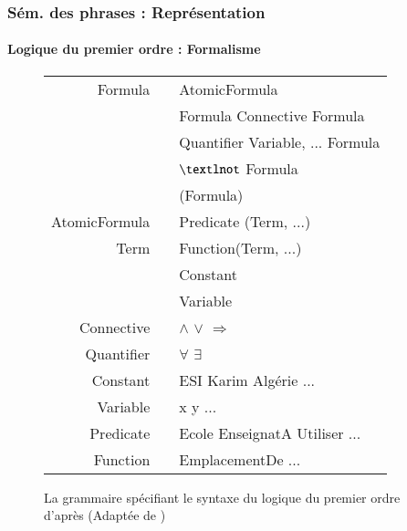 \documentclass[xcolor=table]{beamer}
\begin{document}
\begin{frame}
	\frametitle{Sém. des phrases : Représentation}
	\framesubtitle{Logique du premier ordre : Formalisme}
	
	\begin{figure}
		\scriptsize
		\begin{tabular}{rcl}
			\hline\hline
			Formula & \textrightarrow & AtomicFormula \\
			        & \textbar        & Formula Connective Formula \\
			        & \textbar        & Quantifier Variable, ... Formula \\
			        & \textbar        & $\textlnot$ Formula \\
			        & \textbar        & (Formula) \\
			AtomicFormula & \textrightarrow & Predicate (Term, ...) \\
			Term    & \textrightarrow & Function(Term, ...) \\
			        & \textbar        & Constant \\
			        & \textbar        & Variable \\
			Connective & \textrightarrow & $\wedge$ \textbar $\vee$ \textbar $\Rightarrow$ \\
			Quantifier & \textrightarrow & $\forall$ \textbar $\exists$ \\
			Constant & \textrightarrow & ESI \textbar Karim \textbar Algérie ...\\
			Variable & \textrightarrow & x \textbar y \textbar ... \\
			Predicate & \textrightarrow & Ecole \textbar EnseignatA \textbar Utiliser \textbar ... \\
			Function & \textrightarrow & EmplacementDe \textbar ... \\
			\hline\hline
		\end{tabular}
		\caption{La grammaire spécifiant le syntaxe du logique du premier ordre d'après \cite{2019-jurafsky-martin} (Adaptée de \cite{2002-russell-norvig})}
	\end{figure}
	
\end{frame}
\end{document}
